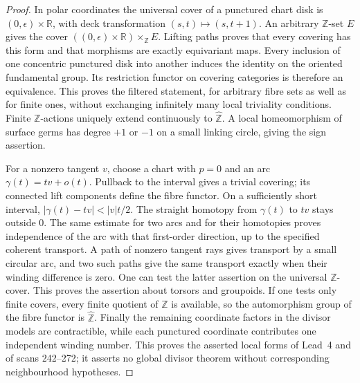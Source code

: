 \begin{proof}
In polar coordinates the universal cover of a punctured chart disk
is $(0,\epsilon)\times\mathbb R$, with deck transformation
$(s,t)\mapsto(s,t+1)$.  An arbitrary $\mathbb Z$-set $E$ gives the
cover $((0,\epsilon)\times\mathbb R)\times_{\mathbb Z}E$.
Lifting paths proves that every covering has this form and that
morphisms are exactly equivariant maps.  Every inclusion of one
concentric punctured disk into another induces the identity on the
oriented fundamental group.  Its restriction functor on covering
categories is therefore an equivalence.  This proves the filtered
statement, for arbitrary fibre sets as well as for finite ones,
without exchanging infinitely many local triviality conditions.
Finite $\mathbb Z$-actions uniquely extend continuously to
$\widehat{\mathbb Z}$.  A local homeomorphism of surface germs has
degree $+1$ or $-1$ on a small linking circle, giving the sign assertion.

For a nonzero tangent $v$, choose a chart with $p=0$ and an arc
$\gamma(t)=tv+o(t)$.  Pullback to the interval gives a trivial
covering; its connected lift components define the fibre functor.
On a sufficiently short interval,
$|\gamma(t)-tv|<|v|t/2$.  The straight homotopy from $\gamma(t)$
to $tv$ stays outside $0$.  The same estimate for two arcs and
for their homotopies proves independence of the arc with that
first-order direction, up to the specified coherent transport.
A path of nonzero tangent rays gives transport by a small circular
arc, and two such paths give the same transport exactly when their
winding difference is zero.  One can test the latter assertion on
the universal $\mathbb Z$-cover.  This proves the assertion about
torsors and groupoids.  If one tests only finite covers, every
finite quotient of $\mathbb Z$ is available, so the automorphism
group of the fibre functor is $\widehat{\mathbb Z}$.
Finally the remaining coordinate factors in the divisor models
are contractible, while each punctured coordinate contributes one
independent winding number.  This proves the asserted local forms
of Lead~4 and of scans 242--272; it asserts no global divisor theorem
without corresponding neighbourhood hypotheses.
\end{proof}

